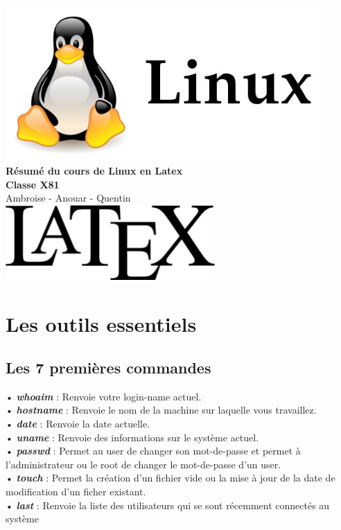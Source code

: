 \documentclass[a4paper, 11pt, french, oneside]{book}
\begin{document}
	\begin{titlepage}
		\begin{center}
			\includegraphics[width=12cm]{linux.jpg}%
			\hspace{60pt}%
			\vspace{50pt}%
			\LARGE
			\textbf{Résumé du cours de Linux en Latex}\\
			\color{red}
			\textbf{Classe X81}\\
			Ambroise - Anouar - Quentin\\
			\vspace{50pt}%
			\includegraphics[width=8cm]{latex.jpg}%
		\end{center}
	\end{titlepage}
		      
	\tableofcontents
	\frontmatter
	\mainmatter
	\chapter{Les outils essentiels}
		\section{Les 7 premières commandes}
         • \textbf {\textit{\color{red}whoaim}} : Renvoie votre login-name actuel.\\
         • \textbf {\textit{\color{red}hostname}} : Renvoie le nom de la machine sur laquelle vous travaillez.\\
         • \textbf {\textit{\color{red}date}} : Renvoie la date actuelle.\\
         • \textbf {\textit{\color{red}uname}} : Renvoie des informations sur le système actuel.\\
         • \textbf{\textit{\color{red}passwd}} : Permet au user de changer son mot-de-passe et permet à l’administrateur ou le root de changer le mot-de-passe d’un user.\\
         • \textbf{\textit{\color{red}touch}} : Permet la création d’un fichier vide ou la mise à jour de la date de modification d’un ficher existant.\\
         • \textbf{\textit{\color{red}last}} : Renvoie la liste des utilisateurs qui se sont récemment connectés au système\\
\end{document}

